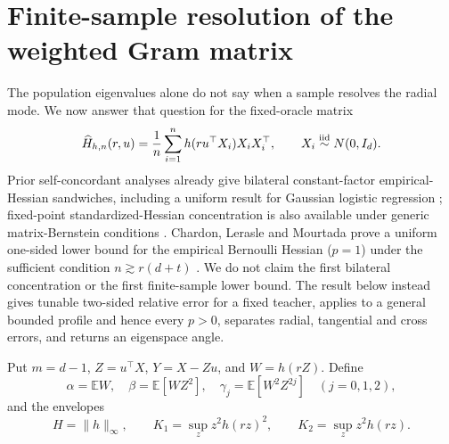\documentclass[11pt]{article}
\newcommand{\E}{\mathbb E}
\begin{document}
\section{Finite-sample resolution of the weighted Gram matrix}
\label{sec:finite}

The population eigenvalues alone do not say when a sample resolves the radial mode.  We now answer that question
for the fixed-oracle matrix
\[
 \widehat H_{h,n}(r,u)=\frac1n\sum_{i=1}^n h(ru^\top X_i)X_iX_i^\top,
 \qquad X_i\stackrel{\rm iid}{\sim}N(0,I_d).
\]
Prior self-concordant analyses already give bilateral constant-factor empirical-Hessian sandwiches, including a
uniform result for Gaussian logistic regression \cite[Eq.~(92)]{ostrovskii2021}; fixed-point standardized-Hessian
concentration is also available under generic matrix-Bernstein conditions \cite{fisher2023}.  Chardon, Lerasle and
Mourtada prove a uniform one-sided lower bound for the empirical Bernoulli Hessian ($p=1$) under the sufficient
condition $n\gtrsim r(d+t)$ \cite[Theorem 6]{chardon2024}.  We do not claim the first bilateral concentration or
the first finite-sample lower bound.  The result below instead gives tunable two-sided relative error for a fixed
teacher, applies to a general bounded profile and hence every $p>0$, separates radial, tangential and cross errors,
and returns an eigenspace angle.

Put $m=d-1$, $Z=u^\top X$, $Y=X-Zu$, and $W=h(rZ)$.  Define
\[
 \alpha=\E W,\quad \beta=\E[WZ^2],\quad
 \gamma_j=\E[W^2Z^{2j}]\quad(j=0,1,2),
\]
and the envelopes
\[
 H=\lVert h\rVert_\infty,\qquad
 K_1=\sup_z z^2h(rz)^2,\qquad K_2=\sup_z z^2h(rz).
\]
\end{document}
